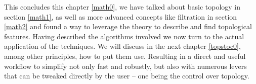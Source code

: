 This concludes this chapter \ref{math0}, we have talked about basic topology in section \ref{math1}, as well as more advanced concepts like filtration in section \ref{math2} and found a way to leverage the theory to describe and find topological features.
Having described the algorithms involved we now turn to the actual application of the techniques.
We will discuss in the next chapter \ref{topstoc0}, among other principles, how to put them use.
Resulting in a direct and useful workflow to simplify not only fast and robustly, but also with numerous levers that can be tweaked directly by the user -- one being the control over topology.

